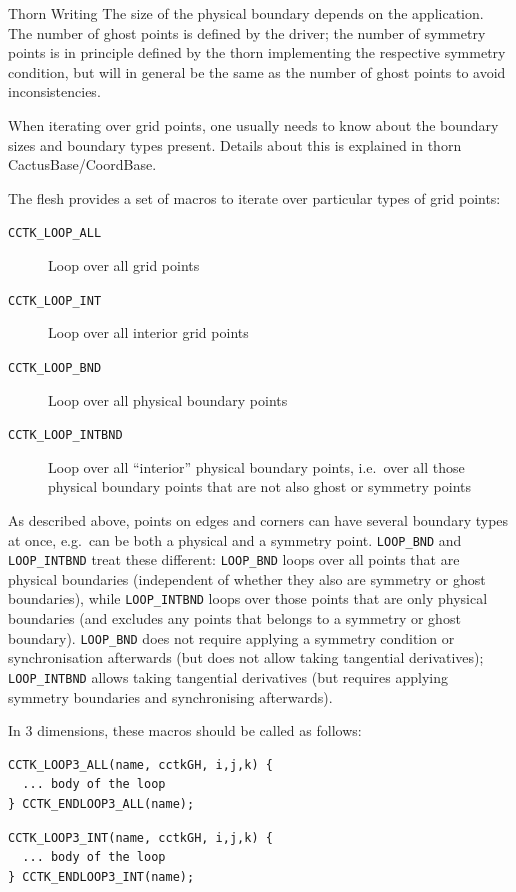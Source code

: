 \begin{cactuspart}{Thorn Writing}
The size of the physical boundary depends on the application. The
number of ghost points is defined by the driver; the number of
symmetry points is in principle defined by the thorn implementing the
respective symmetry condition, but will in general be the same as the
number of ghost points to avoid inconsistencies.

When iterating over grid points, one usually needs to know about the
boundary sizes and boundary types present. Details about this is
explained in thorn CactusBase/CoordBase.

The flesh provides a set of macros to iterate over particular types of
grid points:
\begin{description}
\item[\texttt{CCTK\_LOOP\_ALL}] Loop over all grid points
\item[\texttt{CCTK\_LOOP\_INT}] Loop over all interior grid points
\item[\texttt{CCTK\_LOOP\_BND}] Loop over all physical boundary points
\item[\texttt{CCTK\_LOOP\_INTBND}] Loop over all ``interior'' physical
  boundary points, i.e.\ over all those physical boundary points that
  are not also ghost or symmetry points
\end{description}

As described above, points on edges and corners can have several
boundary types at once, e.g.\ can be both a physical and a symmetry
point. \texttt{LOOP\_BND} and \texttt{LOOP\_INTBND} treat these
different: \texttt{LOOP\_BND} loops over all points that are physical
boundaries (independent of whether they also are symmetry or ghost
boundaries), while \texttt{LOOP\_INTBND} loops over those points that
are only physical boundaries (and excludes any points that belongs to
a symmetry or ghost boundary). \texttt{LOOP\_BND} does not require
applying a symmetry condition or synchronisation afterwards (but does
not allow taking tangential derivatives); \texttt{LOOP\_INTBND} allows
taking tangential derivatives (but requires applying symmetry
boundaries and synchronising afterwards).

In 3 dimensions, these macros should be called as follows:
\begin{verbatim}
CCTK_LOOP3_ALL(name, cctkGH, i,j,k) {
  ... body of the loop
} CCTK_ENDLOOP3_ALL(name);
\end{verbatim}

\begin{verbatim}
CCTK_LOOP3_INT(name, cctkGH, i,j,k) {
  ... body of the loop
} CCTK_ENDLOOP3_INT(name);
\end{verbatim}


\end{cactuspart}
